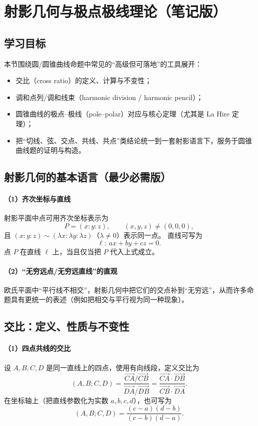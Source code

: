\documentclass[UTF8]{ctexart}
\begin{document}
	
	\section{射影几何与极点极线理论（笔记版）}
	
	\subsection{学习目标}
	本节围绕圆/圆锥曲线命题中常见的“高级但可落地”的工具展开：
	\begin{itemize}
		\item 交比（cross ratio）的定义、计算与不变性；
		\item 调和点列/调和线束（harmonic division / harmonic pencil）；
		\item 圆锥曲线的极点--极线（pole--polar）对应与核心定理（尤其是 La Hire 定理）；
		\item 把“切线、弦、交点、共线、共点”类结论统一到一套射影语言下，服务于圆锥曲线题的证明与构造。
	\end{itemize}
	
	\subsection{射影几何的基本语言（最少必需版）}
	\paragraph{（1）齐次坐标与直线}
	射影平面中点可用齐次坐标表示为
	\[
	P=(x:y:z),\qquad (x,y,z)\neq (0,0,0),
	\]
	且 $(x:y:z)\sim (\lambda x:\lambda y:\lambda z)$（$\lambda\neq 0$）表示同一点。
	直线可写为
	\[
	\ell:\ ax+by+cz=0.
	\]
	点 $P$ 在直线 $\ell$ 上，当且仅当把 $P$ 代入上式成立。
	
	\paragraph{（2）“无穷远点/无穷远直线”的直观}
	欧氏平面中“平行线不相交”，射影几何中把它们的交点补到“无穷远”，从而许多命题具有更统一的表述（例如把相交与平行视为同一种现象）。
	
	\subsection{交比：定义、性质与不变性}
	\paragraph{（1）四点共线的交比}
	设 $A,B,C,D$ 是同一直线上的四点，使用有向线段，定义交比为
	\[
	(A,B;C,D)=\frac{\overrightarrow{CA}/\overrightarrow{CB}}{\overrightarrow{DA}/\overrightarrow{DB}}
	=\frac{\overrightarrow{CA}\cdot \overrightarrow{DB}}{\overrightarrow{CB}\cdot \overrightarrow{DA}}.
	\]
	在坐标轴上（把直线参数化为实数 $a,b,c,d$），也可写为
	\[
	(A,B;C,D)=\frac{(c-a)(d-b)}{(c-b)(d-a)}.
	\]
	
\end{document}
